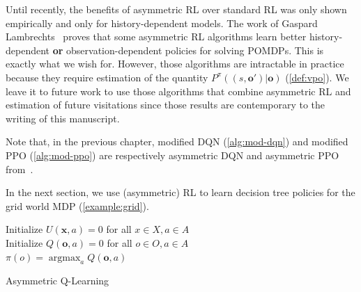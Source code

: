 Until recently, the benefits of asymmetric RL over standard RL was only shown empirically and only for history-dependent models.
The work of Gaspard Lambrechts~\cite{justif-asym} proves that some asymmetric RL algorithms learn better history-dependent \textbf{or} observation-dependent policies for solving POMDPs.
This is exactly what we wish for. However, those algorithms are intractable in practice because they require estimation of the quantity $P^{\pi}((s, \boldsymbol{o}')|\boldsymbol{o})$ (\ref{def:vpo}).
We leave it to future work to use those algorithms that combine asymmetric RL and estimation of future visitations since those results are contemporary to the writing of this manuscript.

Note that, in the previous chapter, modified DQN (\ref{alg:mod-dqn}) and modified PPO (\ref{alg:mod-ppo}) are respectively asymmetric DQN and asymmetric PPO from~\cite{baisero-dqn,baisero-ppo}.

In the next section, we use (asymmetric) RL to learn decision tree policies for the grid world MDP (\ref{example:grid}).

\begin{algorithm}
    Initialize $U(\boldsymbol{x},a) = 0$ for all $x \in X, a \in A$ \\
    Initialize $Q(\boldsymbol{o},a) = 0$ for all $o \in O, a \in A$ \\

    $\pi(o) = \operatorname{argmax}_a Q(\boldsymbol{o},a)$ 
    \caption{Asymmetric Q-Learning}\label{alg:asymqlearning}
\end{algorithm}


